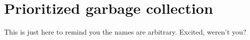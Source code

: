 \section{Prioritized garbage collection}
\label{sec:prioritized}

This is just here to remind you the names are arbitrary.
Excited, weren't you?
